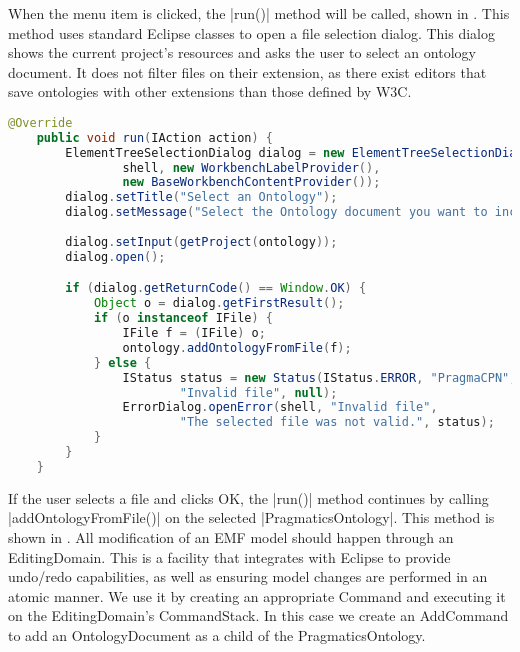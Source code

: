 When the menu item is clicked, the |run()| method will be called, shown in
. This method uses standard Eclipse classes to
open a file selection dialog. This dialog shows the current project's resources
and asks the user to select an ontology document. It does not filter files on
their extension, as there exist editors that save ontologies with other
extensions than those defined by W3C.

\begin{lstlisting}[language=Java,float,label=lst:AddOntologyAction_run,
caption=AddOntologyAction run()]
	@Override
	public void run(IAction action) {
		ElementTreeSelectionDialog dialog = new ElementTreeSelectionDialog(
				shell, new WorkbenchLabelProvider(),
				new BaseWorkbenchContentProvider());
		dialog.setTitle("Select an Ontology");
		dialog.setMessage("Select the Ontology document you want to include in the net:");
		
		dialog.setInput(getProject(ontology));
		dialog.open();

		if (dialog.getReturnCode() == Window.OK) {
			Object o = dialog.getFirstResult();
			if (o instanceof IFile) {
				IFile f = (IFile) o;
				ontology.addOntologyFromFile(f);
			} else {
				IStatus status = new Status(IStatus.ERROR, "PragmaCPN", 0,
						"Invalid file", null);
				ErrorDialog.openError(shell, "Invalid file",
						"The selected file was not valid.", status);
			}
		}
	}
\end{lstlisting}

If the user selects a file and clicks OK, the |run()| method continues by
calling |addOntologyFromFile()| on the selected |PragmaticsOntology|. This
method is shown in . All modification of an EMF
model should happen through an EditingDomain. This is a facility that integrates
with Eclipse to provide undo/redo capabilities, as well as ensuring 
model changes are performed in an atomic manner. We use it by creating an
appropriate Command and executing it on the EditingDomain's CommandStack. In
this case we create an AddCommand to add an OntologyDocument as a child of the
PragmaticsOntology. 

